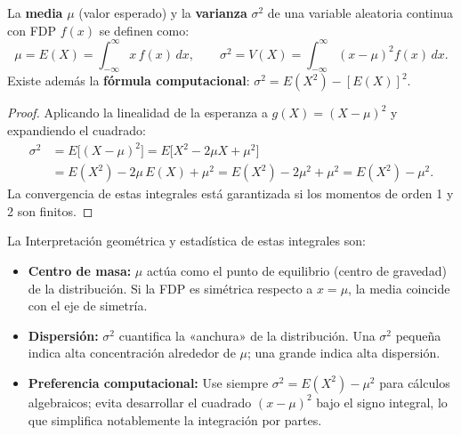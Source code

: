 \begin{theorem}
La \textbf{media} $\mu$ (valor esperado) y la \textbf{varianza} $\sigma^2$ de una variable
aleatoria continua con FDP $f(x)$ se definen como:
\[
  \mu = E(X) = \int_{-\infty}^{\infty} x\,f(x)\,dx,
  \qquad
  \sigma^2 = V(X) = \int_{-\infty}^{\infty}(x-\mu)^2 f(x)\,dx.
\]
Existe además la \textbf{fórmula computacional}: $\sigma^2 = E(X^2)-[E(X)]^2$.
\begin{proof}
Aplicando la linealidad de la esperanza a $g(X)=(X-\mu)^2$ y expandiendo el cuadrado:
\begin{align*}
\sigma^2
  &= E\bigl[(X-\mu)^2\bigr]
   = E\bigl[X^2 - 2\mu X + \mu^2\bigr] \\
  &= E(X^2) - 2\mu\,E(X) + \mu^2
   = E(X^2) - 2\mu^2 + \mu^2
   = E(X^2) - \mu^2.
\end{align*}
La convergencia de estas integrales está garantizada si los momentos de orden 1 y 2 son finitos.
\end{proof}
\end{theorem}

\begin{rem}La Interpretación geométrica y estadística de estas integrales son:
\begin{itemize}
    \item \textbf{Centro de masa:} $\mu$ actúa como el punto de equilibrio (centro de gravedad)
          de la distribución. Si la FDP es simétrica respecto a $x=\mu$, la media coincide con el
          eje de simetría.
    \item \textbf{Dispersión:} $\sigma^2$ cuantifica la «anchura» de la distribución. Una
          $\sigma^2$ pequeña indica alta concentración alrededor de $\mu$; una grande indica alta
          dispersión.
    \item \textbf{Preferencia computacional:} Use siempre $\sigma^2=E(X^2)-\mu^2$ para cálculos
          algebraicos; evita desarrollar el cuadrado $(x-\mu)^2$ bajo el signo integral, lo que
          simplifica notablemente la integración por partes.
\end{itemize}
\end{rem}


